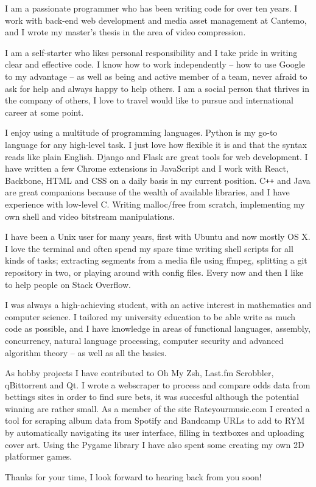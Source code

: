 I am a passionate programmer who has been writing code for over ten years. I work with back-end web development and media asset management at Cantemo, and I wrote my master's thesis in the area of video compression.

I am a self-starter who likes personal responsibility and I take pride in writing clear and effective code. I know how to work independently -- how to use Google to my advantage -- as well as being and active member of a team, never afraid to ask for help and always happy to help others. I am a social person that thrives in the company of others, I love to travel would like to pursue and international career at some point.

I enjoy using a multitude of programming languages. Python is my go-to language for any high-level task. I just love how flexible it is and that the syntax reads like plain English. Django and Flask are great tools for web development. I have written a few Chrome extensions in JavaScript and I work with React, Backbone, HTML and CSS on a daily basis in my current position. C\texttt{++} and Java are great companions because of the wealth of available libraries, and I have experience with low-level C. Writing malloc/free from scratch, implementing my own shell and video bitstream manipulations.

I have been a Unix user for many years, first with Ubuntu and now mostly OS X. I love the terminal and often spend my spare time writing shell scripts for all kinds of tasks; extracting segments from a media file using ffmpeg, splitting a git repository in two, or playing around with config files. Every now and then I like to help people on Stack Overflow.

I was always a high-achieving student, with an active interest in mathematics and computer science. I tailored my university education to be able write as much code as possible, and I have knowledge in areas of functional languages, assembly, concurrency, natural language processing, computer security and advanced algorithm theory -- as well as all the basics.

As hobby projects I have contributed to Oh My Zsh, Last.fm Scrobbler, qBittorrent and Qt. I wrote a webscraper to process and compare odds data from bettings sites in order to find sure bets, it was succesful although the potential winning are rather small. As a member of the site Rateyourmusic.com I created a tool for scraping album data from Spotify and Bandcamp URLs to add to RYM by automatically navigating its user interface, filling in textboxes and uploading cover art. Using the Pygame library I have also spent some creating my own 2D platformer games.

Thanks for your time, I look forward to hearing back from you soon!
